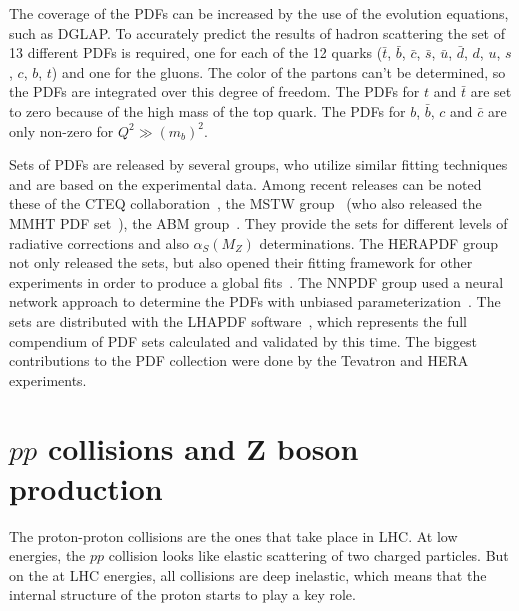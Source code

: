 The coverage of the PDFs can be increased by the use of the evolution equations, such as DGLAP. To accurately predict the results of hadron scattering the set of 13 different PDFs is required, one for each of the 12 quarks ($\bar{t}$, $\bar{b}$, $\bar{c}$, $\bar{s}$, $\bar{u}$, $\bar{d}$, $d$, $u$, $s$, $c$, $b$, $t$) and one for the gluons. The color of the partons can't be determined, so the PDFs are integrated over this degree of freedom. The PDFs for $t$ and $\bar{t}$ are set to zero because of the high mass of the top quark. The PDFs for $b$, $\bar{b}$, $c$ and $\bar{c}$ are only non-zero for $Q^{2} \gg (m_{b})^{2}$.

Sets of PDFs are released by several groups, who utilize similar fitting techniques and are based on the experimental data. Among recent releases can be noted these of the CTEQ collaboration~\cite{lib:MC_pdfct10}, the MSTW group~\cite{lib:MC_pdfmstw1, lib:MC_pdfmstw2} (who also released the MMHT PDF set~\cite{lib:MC_pdfmmht}), the ABM group~\cite{lib:MC_pdfabm}. They provide the sets for different levels of radiative corrections and also $\alpha_{S}(M_{Z})$ determinations. The HERAPDF group not only released the sets, but also opened their fitting framework for other experiments in order to produce a global fits~\cite{lib:MC_pdfhera}. The NNPDF group used a neural network approach to determine the PDFs with unbiased parameterization~\cite{lib:MC_nnpdf1, lib:MC_nnpdf2, lib:MC_nnpdf3}. The sets are distributed with the LHAPDF software~\cite{lib:lhapdf}, which represents the full compendium of PDF sets calculated and validated by this time. The biggest contributions to the PDF collection were done by the Tevatron and HERA experiments.

\section{$pp$ collisions and Z boson production}

The proton-proton collisions are the ones that take place in LHC. At low energies, the $pp$ collision looks like elastic scattering of two charged particles. But on the at LHC energies, all collisions are deep inelastic, which means that the internal structure of the proton starts to play a key role.

